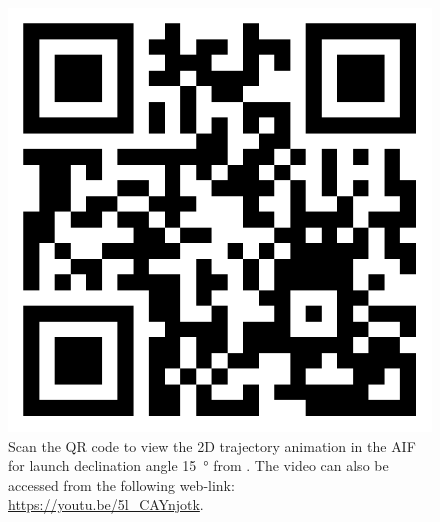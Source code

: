 \begin{figure}[htb]
\centering
\captionsetup{justification=centering}
\includegraphics[width=\textwidth, height=0.1\textheight, keepaspectratio=true]{non_conservative_escape_speed/declination_15_animation.png}
\caption{Scan the QR code to view the 2D trajectory animation in the \gls{AIF} for launch declination angle \SI{15}{\degree} from . The video can also be accessed from the following web-link: \url{https://youtu.be/5l_CAYnjotk}.}
\label{fig:declination_15_animation}
\end{figure}
\FloatBarrier
